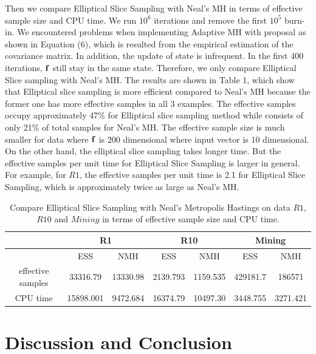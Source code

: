 \documentclass{article}
\begin{document}
Then we compare Elliptical Slice Sampling with Neal's MH in terms of effective sample size and CPU time. We run $10^6$ iterations and remove the first $10^5$ burn-in. We encountered problems when implementing Adaptive MH with proposal as shown in Equation (6), which is resulted from the empirical estimation of the covariance matrix. In addition, the update of state is infrequent. In the first 400 iterations, $\bf{f}$ still stay in the same state. Therefore, we only compare Elliptical Slice sampling with Neal's MH. The results are shown in Table 1, which show that Elliptical slice sampling is more efficient compared to Neal's MH because the former one has more effective samples in all 3 examples. The effective samples occupy approximately 47\% for Elliptical slice sampling method while consists of only 21\% of total samples for Neal's MH. The effective sample size is much smaller for data where $\bf{f}$ is 200 dimensional where input vector is 10 dimensional. On the other hand, the elliptical slice sampling takes longer time. But the effective samples per unit time for Elliptical Slice Sampling is larger in general. For example, for $R1$, the effective samples per unit time is 2.1 for Elliptical Slice Sampling, which is approximately twice as large as Neal's MH.

\begin{table}[!htbp]
\centering
\caption{Compare Elliptical Slice Sampling with Neal's Metropolis Hastings on data $R1$, $R10$ and $Mining$ in terms of effective sample size and CPU time.}
\begin{tabular}{*7c}
\toprule
 {} &  \multicolumn{2}{c}{R1} & \multicolumn{2}{c}{R10} & \multicolumn{2}{c}{Mining}\\
\midrule
{}   & ESS   & NMH    & ESS   & NMH  & ESS   & NMH\\
effective samples   &  33316.79 & 13330.98   & 2139.793  & 1159.535 & 429181.7 & 186571\\
CPU time   &  15898.001 & 9472.684   & 16374.79  & 10497.30 & 3448.755 & 3271.421\\

\bottomrule

\end{tabular}
\end{table}

\section{Discussion and Conclusion}
\end{document}
